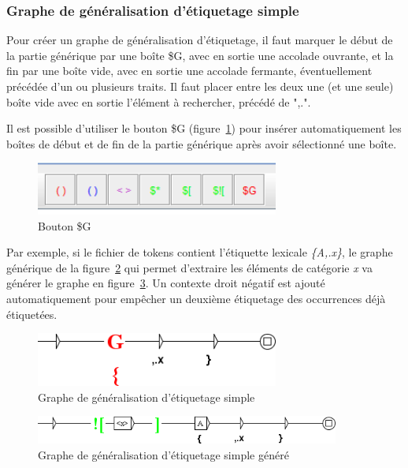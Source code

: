 \subsubsection{Graphe de généralisation d'étiquetage simple}

Pour créer un graphe de généralisation d'étiquetage, il faut marquer le début de la partie générique par une boîte \$G, avec en sortie une accolade ouvrante, et la fin par une boîte vide, avec en sortie une accolade fermante, éventuellement précédée d'un ou plusieurs traits. Il faut placer entre les deux une (et une seule) boîte vide avec en sortie l'élément à rechercher, précédé de ",.".

\bigskip
Il est possible d'utiliser le bouton \$G (figure~\ref{fig:bouton_g}) pour insérer automatiquement les boîtes de début et de fin de la partie générique après avoir sélectionné une boîte.

\begin{figure}[!htb]
  \centering
  \includegraphics[width=8cm]{resources/img/bouton_g.png}
  \caption{Bouton \$G}
  \label{fig:bouton_g}
\end{figure}

\bigskip
Par exemple, si le fichier de tokens contient l'étiquette lexicale \emph{\{A,.x\}}, le graphe générique de la figure~\ref{fig:graphe_generique_simple} qui permet d'extraire les éléments de catégorie \textit{x} va générer le graphe en figure~\ref{fig:graphe_generique_simple_genere}. Un contexte droit négatif est ajouté automatiquement pour empêcher un deuxième étiquetage des occurrences déjà étiquetées.

\begin{figure}[!htb]
  \centering
  \includegraphics[width=8cm]{resources/img/graphe_generique_simple.png}
  \caption{Graphe de généralisation d'étiquetage simple}
  \label{fig:graphe_generique_simple}
\end{figure}

\begin{figure}[!htb]
  \centering
  \includegraphics[width=10cm]{resources/img/graphe_generique_simple_genere.png}
  \caption{Graphe de généralisation d'étiquetage simple généré}
  \label{fig:graphe_generique_simple_genere}
\end{figure}

